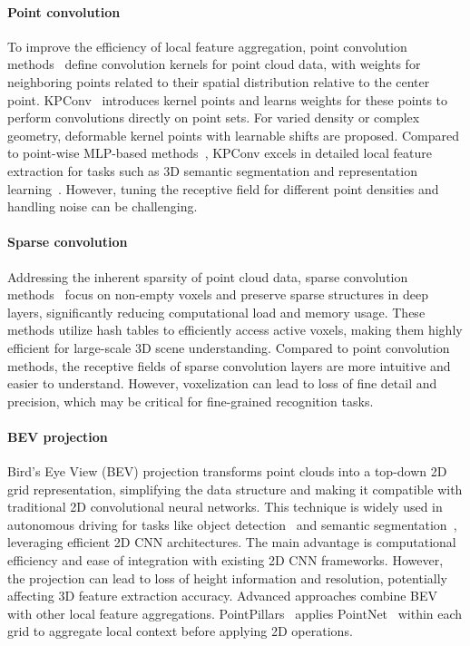 \paragraph{Point convolution}
To improve the efficiency of local feature aggregation, point convolution methods~\cite{li2018pointcnn,wu2019pointconv,thomas2019kpconv} define convolution kernels for point cloud data, with weights for neighboring points related to their spatial distribution relative to the center point. KPConv~\cite{thomas2019kpconv} introduces kernel points and learns weights for these points to perform convolutions directly on point sets. For varied density or complex geometry, deformable kernel points with learnable shifts are proposed. Compared to point-wise MLP-based methods~\cite{qi2017pointnet,qi2017pointnet++}, KPConv excels in detailed local feature extraction for tasks such as 3D semantic segmentation and representation learning~\cite{bai2020d3feat}. However, tuning the receptive field for different point densities and handling noise can be challenging.

\paragraph{Sparse convolution}
Addressing the inherent sparsity of point cloud data, sparse convolution methods~\cite{tang2022torchsparse,hackel2020inference,3DSemanticSegmentationWithSubmanifoldSparseConvNet} focus on non-empty voxels and preserve sparse structures in deep layers, significantly reducing computational load and memory usage. These methods utilize hash tables to efficiently access active voxels, making them highly efficient for large-scale 3D scene understanding. Compared to point convolution methods, the receptive fields of sparse convolution layers are more intuitive and easier to understand. However, voxelization can lead to loss of fine detail and precision, which may be critical for fine-grained recognition tasks.

\paragraph{BEV projection}
Bird's Eye View (BEV) projection transforms point clouds into a top-down 2D grid representation, simplifying the data structure and making it compatible with traditional 2D convolutional neural networks. This technique is widely used in autonomous driving for tasks like object detection~\cite{zhou2018voxelnet,lang2019pointpillars} and semantic segmentation~\cite{aksoy2020salsanet}, leveraging efficient 2D CNN architectures. The main advantage is computational efficiency and ease of integration with existing 2D CNN frameworks. However, the projection can lead to loss of height information and resolution, potentially affecting 3D feature extraction accuracy. Advanced approaches combine BEV with other local feature aggregations. PointPillars~\cite{lang2019pointpillars} applies PointNet~\cite{qi2017pointnet} within each grid to aggregate local context before applying 2D operations.

